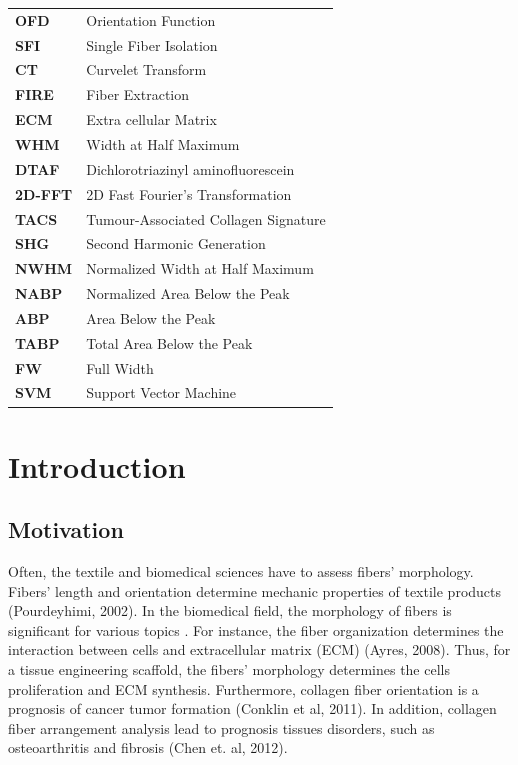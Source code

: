 \documentclass[12pt,a4paper]{article}
\begin{document}
\begin{table}[H]
\begin{center}


\begin{tabular}{ l l }

 \textbf{ OFD } &  Orientation Function  \\
 \textbf{ SFI  } &Single Fiber Isolation  \\
 \textbf{ CT }    & Curvelet Transform  \\
 \textbf{ FIRE  } & Fiber Extraction  \\
 \textbf{ ECM  }  & Extra cellular Matrix  \\
 \textbf{ WHM   } & Width at Half Maximum  \\
 \textbf{ DTAF    } & Dichlorotriazinyl aminoﬂuorescein  \\
 \textbf{ 2D-FFT     } & 2D Fast Fourier’s Transformation  \\
 \textbf{ TACS     } &  Tumour-Associated Collagen Signature  \\
 \textbf{ SHG     } &  Second Harmonic Generation  \\
 \textbf{ NWHM     } &  Normalized Width at Half Maximum  \\
 \textbf{ NABP     } &   Normalized Area Below the Peak \\
 \textbf{ ABP     } &    Area Below the Peak \\
 \textbf{ TABP     } &   Total Area Below the Peak \\
 \textbf{ FW     } &   Full Width \\
 \textbf{ SVM     } &  Support Vector Machine \\
 
\end{tabular}
\end{center}
\end{table}

\thispagestyle{empty}
\newpage





\section{Introduction}

\subsection{Motivation}

Often, the textile and biomedical sciences have to assess fibers' morphology.  Fibers' length and orientation determine mechanic properties of textile products (Pourdeyhimi, 2002). In the biomedical field, the morphology of fibers is significant for various topics . For instance, the fiber organization determines the interaction between cells and extracellular matrix (ECM) (Ayres, 2008). Thus, for a tissue engineering scaffold, the fibers' morphology determines the cells proliferation and ECM synthesis. Furthermore, collagen fiber orientation is a prognosis of cancer tumor formation (Conklin et al, 2011). In addition, collagen fiber arrangement analysis lead to prognosis tissues disorders, such as osteoarthritis and fibrosis (Chen et. al, 2012).
\end{document}
